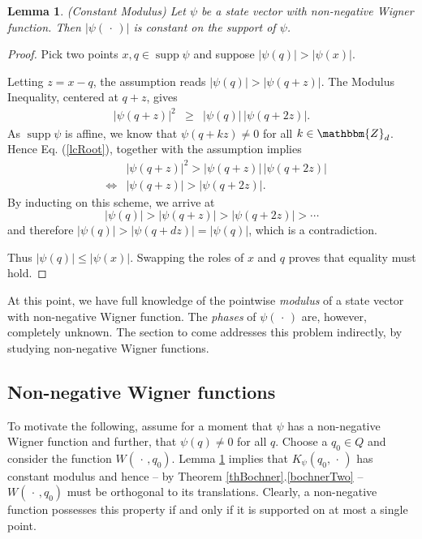 \documentclass[aps,twocolumn,floatfix]{revtex4}
\newtheorem{lemma}[theorem]{Lemma}
\def\ZZ{\mathbbm{Z}}
\def\spacedot{\,\cdot\,}
\DeclareMathOperator{\supp}{supp}
\begin{document}
\begin{lemma}\label{lmModulus}
	\emph{(Constant Modulus)} 
	Let $\psi$ be a state vector with non-negative Wigner function.
	Then $|\psi(\spacedot)|$ is constant on the support of $\psi$.
\end{lemma}


\begin{proof}
	Pick two points $x, q \in \supp\psi$ and suppose $|\psi(q)|>|\psi(x)|$.
	
	Letting $z=x-q$, the assumption reads $|\psi(q)|>|\psi(q+z)|$.  The
	Modulus Inequality, centered at $q+z$, gives
	\begin{eqnarray}\label{lcRoot}
		|\psi(q+z)|^2 
		&\geq& |\psi(q)|\,|\psi(q+2z)|.
	\end{eqnarray}
	As $\supp\psi$ is affine, we know that $\psi(q+kz)\neq0$ for all
	$k\in \ZZ_d$. Hence Eq. (\ref{lcRoot}), together with the assumption
	implies
	\begin{eqnarray*}
		&& |\psi(q+z)|^2 > |\psi(q+z)| \, |\psi(q+2z)| \\
		&\Leftrightarrow&  |\psi(q+z)| > |\psi(q+2z)|.
	\end{eqnarray*}
 	By inducting on this scheme, we arrive at
	\begin{equation*}
		|\psi(q)| > |\psi(q+z)| > |\psi(q+2 z)| > \cdots
	\end{equation*}
	and therefore $|\psi(q)|>|\psi(q+dz)|=|\psi(q)|$, 
	which is a contradiction. 

	Thus $|\psi(q)|\leq|\psi(x)|$. Swapping the roles of $x$ and $q$
	proves that equality must hold.
\end{proof}

At this point, we have full knowledge of the pointwise \emph{modulus}
of a state vector with non-negative Wigner function. The \emph{phases}
of $\psi(\spacedot)$ are, however, completely unknown. The section to come
addresses this problem indirectly, by studying non-negative Wigner
functions. 

\subsection{Non-negative Wigner functions}
\label{scHudsonWigner}

To motivate the following, assume for a moment that $\psi$ has a
non-negative Wigner function and further, that $\psi(q)\neq 0$ for all
$q$.
Choose a $q_0\in Q$ and consider the function $W(\spacedot,q_0)$.
Lemma \ref{lmModulus} implies that $K_\psi(q_0,\spacedot)$ has constant
modulus and hence -- by Theorem \ref{thBochner}.\ref{bochnerTwo} --
$W(\spacedot,q_0)$ must be orthogonal to its translations.  Clearly, a
non-negative function possesses this property if and only if it is
supported on at most a single point.
\end{document}
